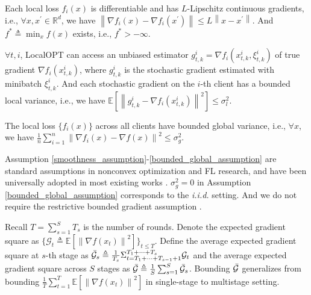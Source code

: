 \begin{assumption}[Smoothness]
\label{smoothness_assumption}
Each local loss $f_i(x)$ is differentiable and has $L$-Lipschitz continuous gradients, i.e., $\forall x, x^\prime\in \mathbb{R}^d$, we have $\left\|\nabla f_i(x)-\nabla f_i(x^\prime)\right\| \leq L \left\| x-x^\prime\right\|$. And $f^\ast\triangleq\min_x f(x)$ exists, i.e., $f^\ast>-\infty$.
\end{assumption}

\begin{assumption}
\label{bounded_local_assumption}
$\forall t, i$, LocalOPT can access an unbiased estimator $g_{t,k}^i=\nabla f_i(x_{t,k}^i, \xi_{t,k}^i)$ of true gradient $\nabla f_i(x_{t,k}^i)$, where $g_{t,k}^i$ is the stochastic gradient estimated with minibatch $\xi_{t,k}^i$. And each stochastic gradient on the $i$-th client has a bounded local variance, i.e., we have $\mathbb{E}\left[\left\| g_{t,k}^i - \nabla f_i(x_{t,k}^i) \right\|^2\right] \leq \sigma^2_l$.
\end{assumption}

\begin{assumption}
\label{bounded_global_assumption}
The local loss $\{f_i(x)\}$ across all clients have bounded global variance, i.e., $\forall x$, we have $\frac{1}{n}\sum_{i=1}^{n}\left\| \nabla f_i(x)-\nabla f(x)\right\|^2\leq\sigma_g^2$.
\end{assumption}

Assumption \ref{smoothness_assumption}-\ref{bounded_global_assumption} are standard assumptions in nonconvex optimization and FL research, and have been universally adopted in most existing works \citep{reddi18adam_convergence,Li2020Fed-Non-IID,reddi2020adaptive,bao2020fast,yang2021achieving,wang22adaptive,wu2023federated,wu2023solving}. $\sigma_g^2=0$ in Assumption \ref{bounded_global_assumption} corresponds to the \textit{i.i.d.} setting. And we do not require the restrictive bounded gradient assumption \citep{reddi18adam_convergence,Avdiukhin21arbitrarycommunication,wu2023faster}.

Recall $T=\sum_{s=1}^{S}T_s$ is the number of rounds. Denote the expected gradient square as $\{\mathcal{G}_t\triangleq\mathbb{E}\left[\left\| \nabla f(x_t)\right\|^2\right]\}_{t\leq T}$. Define the average expected gradient square at $s$-th stage as $\Bar{\mathcal{G}}_s\triangleq\frac{1}{T_s}\Sigma_{t=T_1+\dots+T_{s-1}+1}^{T_1+\dots+T_s} \mathcal{G}_t$ and the average expected gradient square across $S$ stages as $\Bar{\mathcal{G}}\triangleq\frac{1}{S}\sum_{s=1}^S \Bar{\mathcal{G}}_s$. Bounding $\Bar{\mathcal{G}}$ generalizes from bounding $\frac{1}{T}\sum_{t=1}^{T}\mathbb{E}\left[\left\|\nabla f(x_t)\right\|^2\right]$ in single-stage to multistage setting. 

